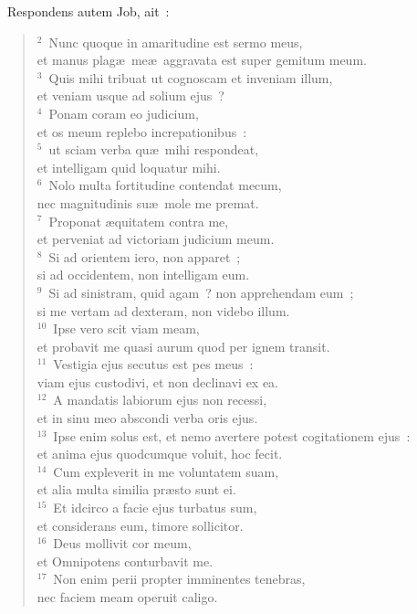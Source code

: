 ~\lettrine[lines=10,image=true,loversize=0.05,lraise=-0.03]{R}{}espondens autem Job, ait~:
\begin{flushleft}\begin{verse}\vspace{6pt}${}^{2}$~Nunc quoque in amaritudine est sermo meus,\\ et manus plag\ae\ me\ae\ aggravata est super gemitum meum.\\
${}^{3}$~Quis mihi tribuat ut cognoscam et inveniam illum,\\ et veniam usque ad solium ejus~?\\
${}^{4}$~Ponam coram eo judicium,\\ et os meum replebo increpationibus~:\\
${}^{5}$~ut sciam verba qu\ae\ mihi respondeat,\\ et intelligam quid loquatur mihi.\\
${}^{6}$~Nolo multa fortitudine contendat mecum,\\ nec magnitudinis su\ae\ mole me premat.\\
${}^{7}$~Proponat \ae quitatem contra me,\\ et perveniat ad victoriam judicium meum.\\
${}^{8}$~Si ad orientem iero, non apparet~;\\ si ad occidentem, non intelligam eum.\\
${}^{9}$~Si ad sinistram, quid agam~? non apprehendam eum~;\\ si me vertam ad dexteram, non videbo illum.\\
${}^{10}$~Ipse vero scit viam meam,\\ et probavit me quasi aurum quod per ignem transit.\\
${}^{11}$~Vestigia ejus secutus est pes meus~:\\ viam ejus custodivi, et non declinavi ex ea.\\
${}^{12}$~A mandatis labiorum ejus non recessi,\\ et in sinu meo abscondi verba oris ejus.\\
${}^{13}$~Ipse enim solus est, et nemo avertere potest cogitationem ejus~:\\ et anima ejus quodcumque voluit, hoc fecit.\\
${}^{14}$~Cum expleverit in me voluntatem suam,\\ et alia multa similia pr\ae sto sunt ei.\\
${}^{15}$~Et idcirco a facie ejus turbatus sum,\\ et considerans eum, timore sollicitor.\\
${}^{16}$~Deus mollivit cor meum,\\ et Omnipotens conturbavit me.\\
${}^{17}$~Non enim perii propter imminentes tenebras,\\ nec faciem meam operuit caligo.\end{verse}\end{flushleft}


